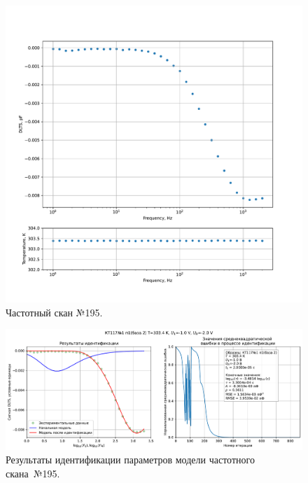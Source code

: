 \begin{figure}[!ht]
    \centering
    \includegraphics[width=1\textwidth]{../plots/КТ117№1_п1(база 2)_2500Гц-1Гц_1пФ_+30С_-1В-2В_100мВ_20мкс_шаг_0,1.pdf}
    \caption{Частотный скан №195.}
    \label{pic:frequency_scan_195}
\end{figure}

\begin{figure}[!ht]
    \centering
    \includegraphics[width=1\textwidth]{../plots/КТ117№1_п1(база 2)_2500Гц-1Гц_1пФ_+30С_-1В-2В_100мВ_20мкс_шаг_0,1_model.pdf}
    \caption{Результаты идентификации параметров модели частотного скана~№195.}
    \label{pic:frequency_scan_model195}
\end{figure}

\pagebreak



